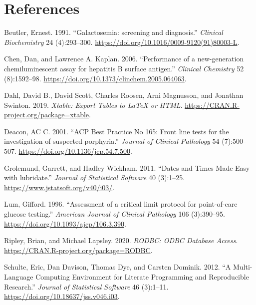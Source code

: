 \documentclass[review]{elsarticle}
\begin{document}
\section*{References}
\label{sec:org117f662}
\begin{hangparas}{1.5em}{1}
\hypertarget{citeproc_bib_item_1}{Beutler, Ernest. 1991. “Galactosemia: screening and diagnosis.” \textit{Clinical Biochemistry} 24 (4):293–300. \href{https://doi.org/10.1016/0009-9120(91)80003-L}{https://doi.org/10.1016/0009-9120(91)80003-L}.}

\hypertarget{citeproc_bib_item_2}{Chen, Dan, and Lawrence A. Kaplan. 2006. “Performance of a new-generation chemiluminescent assay for hepatitis B surface antigen.” \textit{Clinical Chemistry} 52 (8):1592–98. \href{https://doi.org/10.1373/clinchem.2005.064063}{https://doi.org/10.1373/clinchem.2005.064063}.}

\hypertarget{citeproc_bib_item_3}{Dahl, David B., David Scott, Charles Roosen, Arni Magnusson, and Jonathan Swinton. 2019. \textit{Xtable: Export Tables to LaTeX or HTML}. \href{https://CRAN.R-project.org/package=xtable}{https://CRAN.R-project.org/package=xtable}.}

\hypertarget{citeproc_bib_item_4}{Deacon, AC C. 2001. “ACP Best Practice No 165: Front line tests for the investigation of suspected porphyria.” \textit{Journal of Clinical Pathology} 54 (7):500–507. \href{https://doi.org/10.1136/jcp.54.7.500}{https://doi.org/10.1136/jcp.54.7.500}.}

\hypertarget{citeproc_bib_item_5}{Grolemund, Garrett, and Hadley Wickham. 2011. “Dates and Times Made Easy with lubridate.” \textit{Journal of Statistical Software} 40 (3):1–25. \href{https://www.jstatsoft.org/v40/i03/}{https://www.jstatsoft.org/v40/i03/}.}

\hypertarget{citeproc_bib_item_6}{Lum, Gifford. 1996. “Assessment of a critical limit protocol for point-of-care glucose testing.” \textit{American Journal of Clinical Pathology} 106 (3):390–95. \href{https://doi.org/10.1093/ajcp/106.3.390}{https://doi.org/10.1093/ajcp/106.3.390}.}

\hypertarget{citeproc_bib_item_7}{Ripley, Brian, and Michael Lapsley. 2020. \textit{RODBC: ODBC Database Access}. \href{https://CRAN.R-project.org/package=RODBC}{https://CRAN.R-project.org/package=RODBC}.}

\hypertarget{citeproc_bib_item_8}{Schulte, Eric, Dan Davison, Thomas Dye, and Carsten Dominik. 2012. “A Multi-Language Computing Environment for Literate Programming and Reproducible Research.” \textit{Journal of Statistical Software} 46 (3):1–11. \href{https://doi.org/10.18637/jss.v046.i03}{https://doi.org/10.18637/jss.v046.i03}.}


\end{hangparas}
\end{document}
